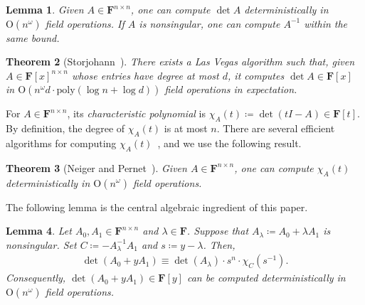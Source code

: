 \documentclass[11pt, a4paper]{article}
\theoremstyle{plain}
\newtheorem{theorem}{Theorem}[section]
\newtheorem{lemma}[theorem]{Lemma}
\theoremstyle{definition}
\theoremstyle{remark}
\newcommand{\bF}{\mathbf{F}}
\begin{document}
\begin{lemma}\label{lem:determinant}
Given $A\in\bF^{n\times n}$, one can compute $\det A$ deterministically in $\mathrm{O}(n^\omega)$ field operations.
If $A$ is nonsingular, one can compute $A^{-1}$ within the same bound.
\end{lemma}

\begin{theorem}[Storjohann~\cite{Storjohann2003}]\label{thm:Storjohann}
There exists a Las Vegas algorithm such that, given $A\in\bF[x]^{n\times n}$ whose entries have degree at most $d$, it computes $\det A\in\bF[x]$ in $\mathrm{O}(n^\omega d \cdot \mathrm{poly}(\log n + \log d))$ field operations in expectation.
\end{theorem}

For $A\in\bF^{n\times n}$, its \emph{characteristic polynomial} is $\chi_A(t)\coloneqq\det(tI-A) \in \bF[t]$.
By definition, the degree of $\chi_A(t)$ is at most $n$.
There are several efficient algorithms for computing $\chi_A(t)$~\cite{Keller-Gehrig1985, RI2011, NP2021, PS2007}, and we use the following result.

\begin{theorem}[Neiger and Pernet~\cite{NP2021}]\label{thm:NP}
Given $A\in\bF^{n\times n}$, one can compute $\chi_A(t)$ deterministically in $\mathrm{O}(n^\omega)$ field operations.
\end{theorem}

The following lemma is the central algebraic ingredient of this paper.

\begin{lemma}\label{lem:matrix-pencil}
Let $A_0,A_1\in\bF^{n\times n}$ and $\lambda\in\bF$.
Suppose that $A_\lambda\coloneqq A_0+\lambda A_1$ is nonsingular.
Set $C\coloneqq-A_\lambda^{-1}A_1$ and $s\coloneqq y-\lambda$.
Then,
\begin{align}\label{eq:matrix-pencil}
\det(A_0+yA_1) \equiv \det(A_\lambda)\cdot s^n \cdot \chi_C(s^{-1}).
\end{align}
Consequently, $\det(A_0+yA_1)\in\bF[y]$ can be computed deterministically in $\mathrm{O}(n^\omega)$ field operations.
\end{lemma}
\end{document}
